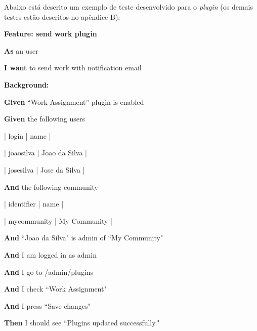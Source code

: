 Abaixo está descrito um exemplo de teste desenvolvido para o \textit{plugin} (os demais testes estão descritos no apêndice B):

\textbf{Feature: send work plugin}

\textbf{As} an user

\textbf{I want} to send work with notification email

\textbf{Background:}

\textbf{Given} ``Work Assignment'' plugin is enabled

\textbf{Given} the following users

      | login     | name          |

      | joaosilva | Joao da Silva |

      | josesilva | Jose da Silva |

\textbf{And} the following community

      | identifier  | name         |

      | mycommunity | My Community |

\textbf{And} ``Joao da Silva" is admin of ``My Community"

\textbf{And} I am logged in as admin

\textbf{And} I go to /admin/plugins

\textbf{And} I check ``Work Assignment"

\textbf{And} I press ``Save changes"

\textbf{Then} I should see ``Plugins updated successfully." 


